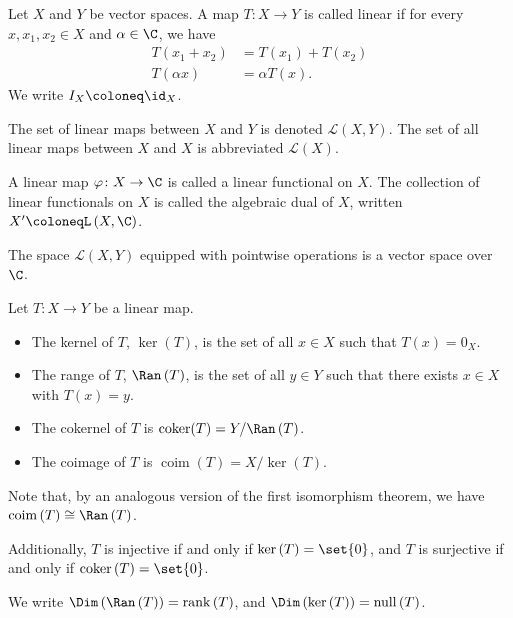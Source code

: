 \begin{definition}
  Let $X$ and $Y$ be vector spaces. A map $T\colon X\rightarrow Y$ is called linear if for every $x,x_1,x_2\in X$ and $\alpha\in \C$, we have
  \begin{align*}
    T\left(x_1 + x_2\right) &= T\left(x_1\right) + T\left(x_2\right)\\
    T\left(\alpha x\right) &= \alpha T\left(x\right).
  \end{align*}
  We write $I_{X} \coloneq \id_{X}$.\newline

  The set of linear maps between $X$ and $Y$ is denoted $\mathcal{L}\left(X,Y\right)$. The set of all linear maps between $X$ and $X$ is abbreviated $\mathcal{L}\left(X\right)$.\newline

  A linear map $\varphi\colon X\rightarrow \C$ is called a linear functional on $X$. The collection of linear functionals on $X$ is called the algebraic dual of $X$, written $X' \coloneq \mathcal{L}\left(X,\C\right)$.\newline

  The space $\mathcal{L}\left(X,Y\right)$ equipped with pointwise operations is a vector space over $\C$.
\end{definition}
\begin{definition}
  Let $T\colon X\rightarrow Y$ be a linear map.
  \begin{itemize}
    \item The kernel of $T$, $\ker\left(T\right)$, is the set of all $x\in X$ such that $T(x) = 0_X$.
    \item The range of $T$, $\Ran\left(T\right)$, is the set of all $y\in Y$ such that there exists $x\in X$ with $T(x) = y$.
    \item The cokernel of $T$ is $\operatorname{coker}(T) = Y/\Ran\left(T\right)$.
    \item The coimage of $T$ is $\operatorname{coim}\left(T\right) = X/\ker\left(T\right)$.
  \end{itemize}
  Note that, by an analogous version of the first isomorphism theorem, we have $\operatorname{coim}\left(T\right) \cong \Ran\left(T\right)$.\newline

  Additionally, $T$ is injective if and only if $\ker\left(T\right) = \set{0}$, and $T$ is surjective if and only if $\operatorname{coker}\left(T\right) = \set{0}$.\newline

  We write $\Dim\left(\Ran\left(T\right)\right) = \operatorname{rank}\left(T\right)$, and $\Dim\left(\ker\left(T\right)\right) = \operatorname{null}\left(T\right)$.
\end{definition}
